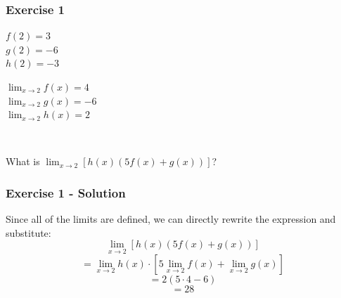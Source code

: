 \documentclass[12pt]{beamer}
\begin{document}
\begin{frame}
	\frametitle{Exercise 1}
	\vspace*{\fill}
	\vspace*{\fill}
	\initclock
	\large
	\begin{minipage}{0.5\textwidth} %
		\begin{center} %
			$f(2) = 3$\\
			$g(2) = -6$\\
			$h(2) = -3$
		\end{center}
	\end{minipage}%
	\begin{minipage}{0.5\textwidth}
		\begin{center}
			$\displaystyle\lim_{x\to2}f(x) = 4$\\
			$\displaystyle\lim_{x\to2}g(x) = -6$\\
			$\displaystyle\lim_{x\to2}h(x) = 2$ %
		\end{center}
	\end{minipage}\\
	\vspace*{\fill}
	\begin{center}
		What is $\displaystyle\lim_{x\to2}[h(x)(5f(x)+g(x))]$?\\
	\end{center}
	\vspace*{\fill}
	\vspace*{\fill}
	\crono
\end{frame}
\begin{frame}
	\frametitle{Exercise 1 - Solution}
	Since all of the limits are defined, we can directly rewrite the expression and substitute:
	\[\displaystyle\lim_{x\to2}[h(x)(5f(x)+g(x))]\]
	\[= \displaystyle\lim_{x\to2}h(x)\cdot\left[5\displaystyle\lim_{x\to2}f(x)+\displaystyle\lim_{x\to2}g(x)\right]\]
	\[= 2(5\cdot4 - 6)\]
	\[= \boxed{28}\]

\end{frame}
\end{document}
